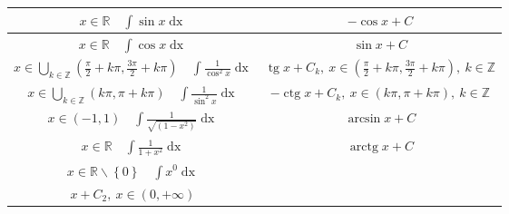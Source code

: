\documentclass{article}
\DeclareMathOperator{\tg}{tg}
\DeclareMathOperator{\ctg}{ctg}
\DeclareMathOperator{\arctg}{arctg}
\DeclareMathOperator{\dx}{dx}
\begin{document}
\begin{tabular}{ |c|c| }
    $\displaystyle x \in \mathbb{R} \quad \int \sin x \dx$                                                                                     & $ \displaystyle-\cos x + C$                                                                        \\ \hline
    $\displaystyle x \in \mathbb{R} \quad \int \cos x \dx$                                                                                     & $ \displaystyle\sin x + C$                                                                         \\ \hline
    $\displaystyle x \in \bigcup_{k \in \mathbb{Z}} \left(\frac{\pi}{2} + k\pi, \frac{3\pi}{2} + k\pi\right)\quad \int \frac{1}{\cos^2 x} \dx$ & $ \tg x + C_k,\ x \in \left(\frac{\pi}{2} + k\pi, \frac{3\pi}{2} + k\pi\right),\ k \in \mathbb{Z}$ \\ \hline
    $\displaystyle x \in \bigcup_{k \in \mathbb{Z}} \left(k\pi, \pi + k\pi\right)\quad \int \frac{1}{\sin^2 x} \dx$                            & $ \displaystyle-\ctg x + C_k,\ x \in \left(k\pi, \pi + k\pi\right),\ k \in \mathbb{Z}$             \\ \hline
    $\displaystyle x \in \left(-1, 1\right) \quad \int \frac{1}{\sqrt{\left(1 - x^2\right)}} \dx                      $                        & $ \arcsin x + C$                                                                                   \\ \hline
    $\displaystyle x \in \mathbb{R} \quad \int \frac{1}{1+x^2} \dx$                                                                            & $ \arctg x + C$                                                                                    \\ \hline
    $\displaystyle x \in \mathbb{R}\backslash \left\{0\right\} \quad \int x^{0} \dx$                                                           &
    \makecell{
    $x + C_1,\ x \in \left(-\infty, 0\right)$                                                                                                                                                                                                       \\
        $x + C_2,\ x \in \left(0, +\infty\right)$
    }                                                                                                                                                                                                                                               \\ \hline
\end{tabular}
\end{document}
